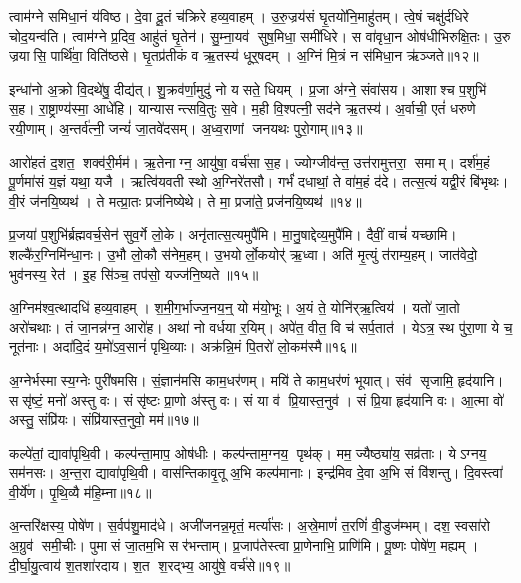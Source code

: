 त्वाम॑ग्ने समिधा॒नं य॑विष्ठ। दे॒वा दू॒तं च॑क्रिरे हव्य॒वाहम्। उ॒रु॒ज्रय॑सं घृ॒तयो॑नि॒माहु॑तम्। त्वे॒षं चक्षु॑र्दधिरे चोद॒यन्व॑ति। त्वाम॑ग्ने प्र॒दिव॒ आहु॑तं घृ॒तेन॑। सु॒म्ना॒यव॑ सुष॒मिधा॒ समी॑धिरे। स वा॑वृधा॒न ओष॑धीभिरुक्षि॒तः। उ॒रु ज्रयासि॒ पार्थि॑वा॒ विति॑ष्ठसे। घृ॒तप्र॑तीकं व ऋ॒तस्य॑ धूर्॒षदम्। अ॒ग्निं मि॒त्रं न स॑मिधा॒न ऋ॑ञ्जते॥१२॥

इन्धा॑नो अ॒क्रो वि॒दथे॑षु॒ दीद्य॑त्। शु॒क्रव॑र्णा॒मुदु॑ नो यसते॒ धियम्। प्र॒जा अ॑ग्ने॒ संवा॑सय। आशाश्च प॒शुभि॑ स॒ह। रा॒ष्ट्राण्य॑स्मा॒ आधे॑हि। यान्यासन्त्सवि॒तुः स॒वे। म॒ही वि॒श्पत्नी॒ सद॑ने ऋ॒तस्य॑। अ॒र्वाची॒ एतं॑ धरुणे रयी॒णाम्। अ॒न्तर्व॑त्नी॒ जन्यं॑ जा॒तवे॑दसम्। अ॒ध्व॒राणां जनयथः पुरो॒गाम्॥१३॥

आरो॑हतं द॒शत॒ शक्व॑री॒र्मम॑। ऋ॒तेनाग्न॒ आयु॑षा॒ वर्च॑सा स॒ह। ज्योग्जीव॑न्त॒ उत्त॑रामुत्तरा॒ समाम्। दर्\mbox{}श॑म॒हं पू॒र्णमा॑सं य॒ज्ञं यथा॒ यजै। ऋत्वि॑यवती स्थो अ॒ग्निरे॑तसौ। गर्भं॑ दधाथां॒ ते वा॑म॒हं द॑दे। तत्स॒त्यं यद्वी॒रं बि॑भृथः। वी॒रं ज॑नयि॒ष्यथ॑। ते मत्प्रा॒तः प्रज॑निष्येथे। ते मा॒ प्रजा॑ते॒ प्रज॑नयि॒ष्यथ॑॥१४॥

प्र॒जया॑ प॒शुभि॑र्ब्रह्मवर्च॒सेन॑ सुव॒र्गे लो॒के। अनृ॑तात्स॒त्यमुपै॑मि। मा॒नु॒षाद्देव्य॒मुपै॑मि। दैवीं॒ वाचं॑ यच्छामि। शल्कै॑र॒ग्निमि॑न्धा॒नः। उ॒भौ लो॒कौ स॑नेम॒हम्। उ॒भयोर्लो॒कयोर्॑ ऋ॒ध्वा। अति॑ मृ॒त्युं त॑राम्य॒हम्। जात॑वेदो॒ भुव॑नस्य॒ रेत॑। इ॒ह सि॑ञ्च॒ तप॑सो॒ यज्ज॑नि॒ष्यते॥१५॥

अ॒ग्निम॑श्व॒त्थादधि॑ हव्य॒वाहम्। श॒मी॒ग॒र्भाज्ज॒नय॒न्॒ यो म॑यो॒भूः। अ॒यं ते॒ योनि॑र्‌ऋ॒त्विय॑। यतो॑ जा॒तो अरो॑चथाः। तं जा॒नन्न॑ग्न॒ आरो॑ह। अथा॑ नो वर्धया र॒यिम्। अपे॑त॒ वीत॒ वि च॑ सर्प॒तात॑। येऽत्र॒ स्थ पु॑रा॒णा ये च॒ नूत॑नाः। अदा॑दि॒दं य॒मो॑ऽव॒सानं॑ पृथि॒व्याः। अक्र॑न्नि॒मं पि॒तरो॑ लो॒कम॑स्मै॥१६॥

अ॒ग्नेर्भस्मास्य॒ग्नेः पुरी॑षमसि। सं॒ज्ञान॑मसि काम॒धर॑णम्। मयि॑ ते काम॒धर॑णं भूयात्। संव॑ सृजामि॒ हृद॑यानि। ससृ॑ष्टं॒ मनो॑ अस्तु वः। संसृ॑ष्टः प्रा॒णो अ॑स्तु वः। सं या व॑ प्रि॒यास्त॒नुव॑। सं प्रि॒या हृद॑यानि वः। आ॒त्मा वो॑ अस्तु॒ संप्रि॑यः। संप्रि॑यास्त॒नुवो॒ मम॑॥१७॥

कल्पे॑तां॒ द्यावा॑पृथि॒वी। कल्प॑न्ता॒माप॒ ओष॑धीः। कल्प॑न्ताम॒ग्नय॒ पृथ॑क्। मम॒ ज्यैष्ठ्या॑य॒ सव्र॑ताः। येऽग्नय॒ सम॑नसः। अ॒न्त॒रा द्यावा॑पृथि॒वी। वास॑न्तिकावृ॒तू अ॒भि कल्प॑मानाः। इन्द्र॑मिव दे॒वा अ॒भि सं वि॑शन्तु। दि॒वस्त्वा॑ वी॒र्ये॑ण। पृ॒थि॒व्यै म॑हि॒म्ना॥१८॥

अ॒न्तरि॑क्षस्य॒ पोषे॑ण। स॒र्वप॑शु॒माद॑धे। अजी॑जनन्न॒मृतं॒ मर्त्या॑सः। अ॒स्रे॒माणं॑ त॒रणिं॑ वी॒डुज॑म्भम्। दश॒ स्वसा॑रो अ॒ग्रुव॑ समी॒चीः। पुमासं जा॒तम॒भि सर॑भन्ताम्। प्र॒जाप॑तेस्त्वा प्रा॒णेनाभि॒ प्राणि॑मि। पू॒ष्णः पोषे॑ण॒ मह्यम्। दी॒र्घा॒यु॒त्वाय॑ श॒तशा॑रदाय। श॒त श॒रद्भ्य॒ आयु॑षे॒ वर्च॑से॥१९॥

